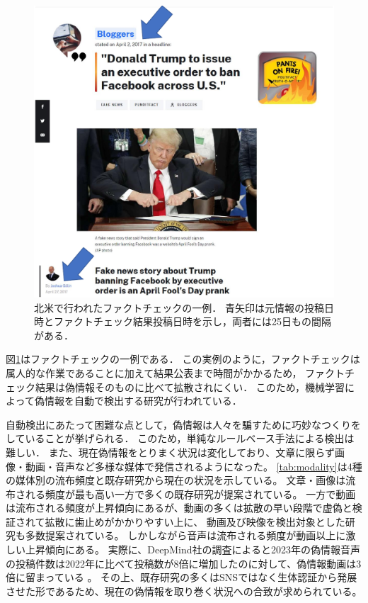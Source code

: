 \begin{figure}[p]
    \centering
    \includegraphics[width=0.8\linewidth]{figures/fact-check.pdf}
    \caption{
        北米で行われたファクトチェックの一例．
        青矢印は元情報の投稿日時とファクトチェック結果投稿日時を示し，両者には25日もの間隔がある．
        }
    \label{fig:example}
\end{figure}

図\ref{fig:example}はファクトチェックの一例である\cite{gillin_2017}．
この実例のように，ファクトチェックは属人的な作業であることに加えて結果公表まで時間がかかるため，
ファクトチェック結果は偽情報そのものに比べて拡散されにくい．
このため，機械学習によって偽情報を自動で検出する研究が行われている．

自動検出にあたって困難な点として，偽情報は人々を騙すために巧妙なつくりをしていることが挙げられる．
このため，単純なルールベース手法による検出は難しい．
また、現在偽情報をとりまく状況は変化しており、文章に限らず画像・動画・音声など多様な媒体で発信されるようになった。
\cref{tab:modality}は4種の媒体別の流布頻度と既存研究から現在の状況を示している。
文章・画像は流布される頻度が最も高い一方で多くの既存研究が提案されている。
一方で動画は流布される頻度が上昇傾向にあるが、動画の多くは拡散の早い段階で虚偽と検証されて拡散に歯止めがかかりやすい上に、
動画及び映像を検出対象とした研究も多数提案されている。
しかしながら音声は流布される頻度が動画以上に激しい上昇傾向にある。
実際に、DeepMind社の調査によると2023年の偽情報音声の投稿件数は2022年に比べて投稿数が8倍に増加したのに対して、偽情報動画は3倍に留まっている \cite{Ulmer_Tong_2023}。
その上、既存研究の多くはSNSではなく生体認証から発展させた形であるため、現在の偽情報を取り巻く状況への合致が求められている。
% 

